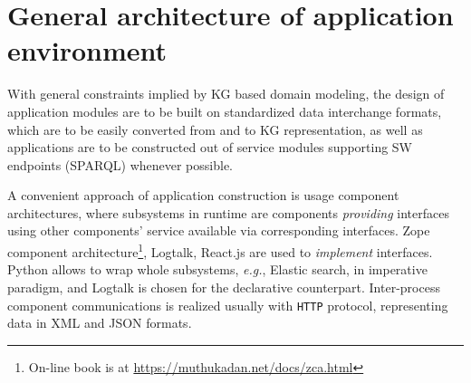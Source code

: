 \documentclass[
]{ceurart}
\begin{document}

\section{General architecture of application environment}
\label{sec:architecture}

With general constraints implied by KG based domain modeling, the design of application modules are to be built on standardized data interchange formats, which are to be easily converted from and to KG representation, as well as applications are to be constructed out of service modules supporting SW endpoints (SPARQL) whenever possible.

A convenient approach of application construction is usage component architectures, where subsystems in runtime are components \emph{providing} interfaces using other components' service available via corresponding interfaces. Zope component architecture\footnote{On-line book is at \url{https://muthukadan.net/docs/zca.html}}, Logtalk, React.js are used to \emph{implement} interfaces.  Python allows to wrap whole subsystems, \emph{e.g.}, Elastic search, in imperative paradigm, and Logtalk is chosen for the declarative counterpart. Inter-process component communications is realized usually with \texttt{HTTP} protocol, representing data in XML and JSON formats.
\end{document}
